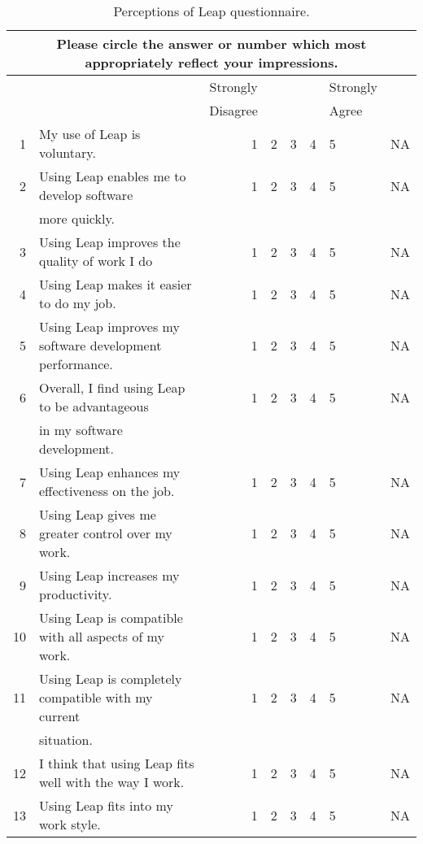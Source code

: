 \begin{table}[htbp]
  \caption{Perceptions of Leap questionnaire.}  
  \begin{tabular}{rlrccclc}\\
    \multicolumn{8}{c}{Please circle the answer or number which most
    appropriately reflect your impressions. } \\
    \hline
    \hline
    &&Strongly&&&&Strongly&\\ 
    &&Disagree&&&&Agree&\\ \hline
    1&My use of Leap is voluntary.&1&2&3&4&5&NA\\ \hline
    2&Using Leap enables me to develop software&1&2&3&4&5&NA\\
    &more quickly.\\ \hline
    3&Using Leap improves the quality of work I do&1&2&3&4&5&NA\\ \hline
    4&Using Leap makes it easier to do my job.&1&2&3&4&5&NA\\ \hline
    5&Using Leap improves my software development performance.&1&2&3&4&5&NA\\ \hline
    6&Overall, I find using Leap to be advantageous&1&2&3&4&5&NA\\
    &in my software development.\\ \hline
    7&Using Leap enhances my effectiveness on the job.&1&2&3&4&5&NA\\ \hline
    8&Using Leap gives me greater control over my work.&1&2&3&4&5&NA\\ \hline
    9&Using Leap increases my productivity.&1&2&3&4&5&NA\\ \hline \hline
    10&Using Leap is compatible with all aspects of my work.&1&2&3&4&5&NA\\ \hline
    11&Using Leap is completely compatible with my current &1&2&3&4&5&NA\\
    &situation.\\ \hline
    12&I think that using Leap fits well with the way I work.&1&2&3&4&5&NA\\
    \hline
    13&Using Leap fits into my work style.&1&2&3&4&5&NA\\ \hline \hline

\end{tabular}
\end{table}
